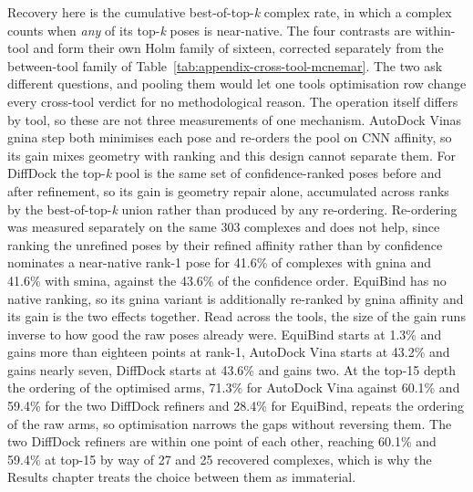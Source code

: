 \begin{longtable}[]
{Recovery here is the cumulative best-of-top-\emph{k} complex rate, in which a complex counts when \emph{any} of its top-\emph{k} poses is near-native. The four contrasts are within-tool and form their own Holm family of sixteen, corrected separately from the between-tool family of Table~\ref{tab:appendix-cross-tool-mcnemar}. The two ask different questions, and pooling them would let one tool\textquotesingle s optimisation row change every cross-tool verdict for no methodological reason. The operation itself differs by tool, so these are not three measurements of one mechanism. AutoDock Vina\textquotesingle s gnina step both minimises each pose and re-orders the pool on CNN affinity, so its gain mixes geometry with ranking and this design cannot separate them. For DiffDock the top-\emph{k} pool is the same set of confidence-ranked poses before and after refinement, so its gain is geometry repair alone, accumulated across ranks by the best-of-top-\emph{k} union rather than produced by any re-ordering. Re-ordering was measured separately on the same 303 complexes and does not help, since ranking the unrefined poses by their refined affinity rather than by confidence nominates a near-native rank-1 pose for 41.6\% of complexes with gnina and 41.6\% with smina, against the 43.6\% of the confidence order. EquiBind has no native ranking, so its gnina variant is additionally re-ranked by gnina affinity and its gain is the two effects together. Read across the tools, the size of the gain runs inverse to how good the raw poses already were. EquiBind starts at 1.3\% and gains more than eighteen points at rank-1, AutoDock Vina starts at 43.2\% and gains nearly seven, DiffDock starts at 43.6\% and gains two. At the top-15 depth the ordering of the optimised arms, 71.3\% for AutoDock Vina against 60.1\% and 59.4\% for the two DiffDock refiners and 28.4\% for EquiBind, repeats the ordering of the raw arms, so optimisation narrows the gaps without reversing them. The two DiffDock refiners are within one point of each other, reaching 60.1\% and 59.4\% at top-15 by way of 27 and 25 recovered complexes, which is why the Results chapter treats the choice between them as immaterial.} \\
\end{longtable}
\endgroup

